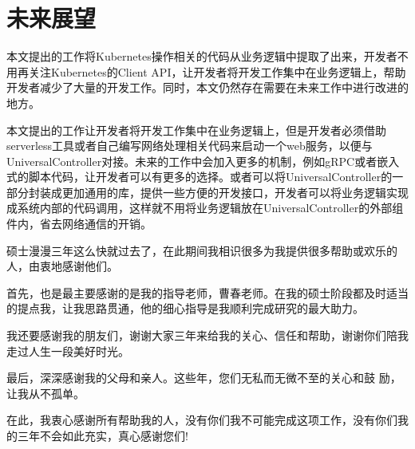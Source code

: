 \documentclass[macfonts,master]{njuthesis}
\begin{document}
\section{未来展望}
本文提出的工作将Kubernetes操作相关的代码从业务逻辑中提取了出来，开发者不用再关注Kubernetes的Client API，让开发者将开发工作集中在业务逻辑上，帮助开发者减少了大量的开发工作。同时，本文仍然存在需要在未来工作中进行改进的地方。

本文提出的工作让开发者将开发工作集中在业务逻辑上，但是开发者必须借助serverless工具或者自己编写网络处理相关代码来启动一个web服务，以便与UniversalController对接。未来的工作中会加入更多的机制，例如gRPC或者嵌入式的脚本代码，让开发者可以有更多的选择。或者可以将UniversalController的一部分封装成更加通用的库，提供一些方便的开发接口，开发者可以将业务逻辑实现成系统内部的代码调用，这样就不用将业务逻辑放在UniversalController的外部组件内，省去网络通信的开销。
\begin{acknowledgement}
  硕士漫漫三年这么快就过去了，在此期间我相识很多为我提供很多帮助或欢乐的人，由衷地感谢他们。
  
首先，也是最主要感谢的是我的指导老师，曹春老师。在我的硕士阶段都及时适当的提点我，让我思路贯通，他的细心指导是我顺利完成研究的最大助力。

我还要感谢我的朋友们，谢谢大家三年来给我的关心、信任和帮助，谢谢你们陪我走过人生一段美好时光。

最后，深深感谢我的父母和亲人。这些年，您们无私而无微不至的关心和鼓 励，让我从不孤单。

在此，我衷心感谢所有帮助我的人，没有你们我不可能完成这项工作，没有你们我的三年不会如此充实，真心感谢您们!
\end{acknowledgement}

\nocite{*}

\end{document}
